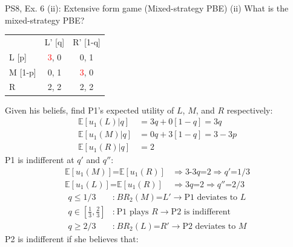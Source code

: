 \begin{frame}{PS8, Ex. 6 (ii): Extensive form game (Mixed-strategy PBE)}
    (ii) What is the mixed-strategy PBE? \vspace{-8pt}
    \begin{multicols}{2}
      \begin{table}
        \begin{tabular}{l|c|c|}
          \multicolumn{1}{c}{} & \multicolumn{1}{c}{L' [q]} & \multicolumn{1}{c}{R' [1-q]} \\\cline{2-3}
          L [p]   & \textcolor{red}{3}, 0 & 0, \color{blue}1 \\\cline{2-3}
          M [1-p] & 0, \color{blue}1 & \textcolor{red}{3}, 0 \\\cline{2-3}
          R       & 2, \color{blue}2 & 2, \color{blue}2 \\\cline{2-3}
        \end{tabular}
      \end{table} \vspace{-4pt}
      Given his beliefs, find P1's expected utility of $L$, $M$, and $R$ respectively: \vspace{-4pt}
      \begin{align*}
        \mathbb{E}[u_1(L)|q]&=3q+0[1-q]=3q\\
        \mathbb{E}[u_1(M)|q]&=0q+3[1-q]=3-3p\\
        \mathbb{E}[u_1(R)|q]&=2
      \end{align*}
      P1 is indifferent at $q'$ and $q''$: \vspace{-6pt}
      \begin{align*}
        \mathbb{E}[u_1(M)]\text{=}\mathbb{E}[u_1(R)]&\Rightarrow \text{3-3}q\text{=}2\Rightarrow q'\text{=}1/3\\
        \mathbb{E}[u_1(L)]\text{=}\mathbb{E}[u_1(R)]&\Rightarrow 3q\text{=}2\Rightarrow q''\text{=}2/3
      \end{align*} \vspace{-16pt}
      \begin{align*}
        q\leq1/3&\text{:}\ BR_2(M)\text{=}L'\rightarrow\text{P1 deviates to }L\\
        q\text{$\in$}{\textstyle\left[\frac{1}{3},\frac{2}{3}\right]}&\text{:}\ \text{P1 plays }R\rightarrow\text{P2 is indifferent}\\
        q\geq2/3&\text{:}\ BR_2(L)\text{=}R'\rightarrow\text{P2 deviates to }M
      \end{align*}
      P2 is indifferent if she believes that: \vspace{-6pt}

\end{multicols}
\end{frame}
